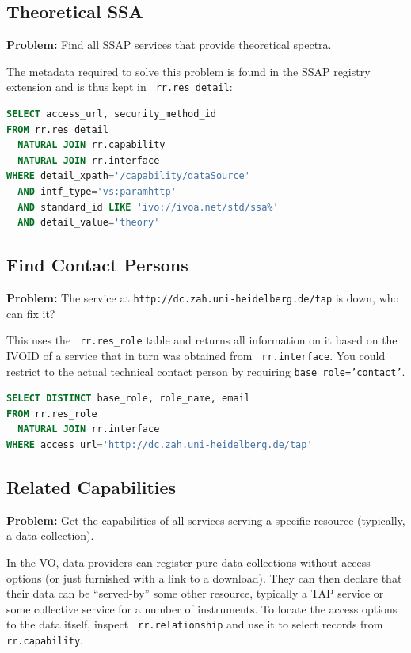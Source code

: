 \documentclass[11pt,a4paper]{ivoa}
\newcommand{\rtent}[1]{\texttt{\color{rtcolor} #1}}
\begin{document}
\subsection{Theoretical SSA}

\textbf{Problem:} Find all SSAP services that
provide theoretical spectra.

The metadata required to solve this problem is found in the SSAP
registry extension and is thus kept in 
\rtent{rr.res\_detail}:


\begin{lstlisting}[language=SQL,flexiblecolumns=true]
SELECT access_url, security_method_id
FROM rr.res_detail 
  NATURAL JOIN rr.capability 
  NATURAL JOIN rr.interface 
WHERE detail_xpath='/capability/dataSource' 
  AND intf_type='vs:paramhttp'
  AND standard_id LIKE 'ivo://ivoa.net/std/ssa%'
  AND detail_value='theory'
\end{lstlisting}


\subsection{Find Contact Persons}

\textbf{Problem:} The service at
\texttt{http://dc.zah.uni-heidelberg.de/tap} is down, who can
fix it?

This uses the \rtent{rr.res\_role} table and returns all information on
it based on the IVOID of a service that in turn was obtained from
\rtent{rr.interface}.  You could restrict to the actual technical
contact person by requiring \texttt{base\_role='contact'}.


\begin{lstlisting}[language=SQL,flexiblecolumns=true]
SELECT DISTINCT base_role, role_name, email 
FROM rr.res_role 
  NATURAL JOIN rr.interface 
WHERE access_url='http://dc.zah.uni-heidelberg.de/tap'
\end{lstlisting}

\subsection{Related Capabilities}

\textbf{Problem:} Get the capabilities of all services serving a
specific resource (typically, a data collection).

In the VO, data providers can register pure data collections without
access options (or just furnished with a link to a download).  They can
then declare that their data can be ``served-by'' some other resource,
typically a TAP service or some collective service for a number of
instruments.  To locate the access options to the data itself, inspect
\rtent{rr.relationship} and use it to select records
from 
\rtent{rr.capability}.
\end{document}
